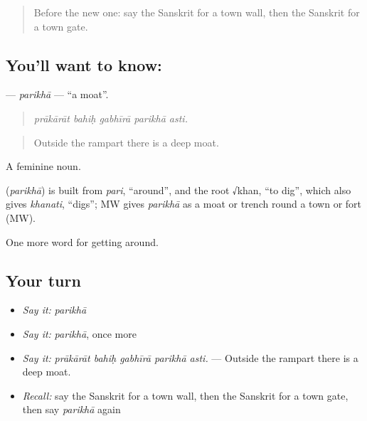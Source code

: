 \label{lesson:SA-C422-parikha}



\begin{quote}
Before the new one: say the Sanskrit for a town wall, then the Sanskrit for a town gate.
\end{quote}

\subsection*{You'll want to know: }
\textbf{} — \emph{parikhā} — \textquotedblleft{}a moat\textquotedblright{}.

\begin{quote}
    
\end{quote}

\begin{quote}
\emph{prākārāt bahiḥ gabhīrā parikhā asti.}
\end{quote}

\begin{quote}
Outside the rampart there is a deep moat.
\end{quote}

A feminine noun.

\begin{cousinweb}
\textbf{} (\emph{parikhā}) is built from \emph{pari}, \textquotedblleft{}around\textquotedblright{}, and the root √khan, \textquotedblleft{}to dig\textquotedblright{}, which also gives \emph{khanati}, \textquotedblleft{}digs\textquotedblright{}; MW gives \emph{parikhā} as a moat or trench round a town or fort (MW).
\end{cousinweb}

\begin{grammarlens}[title={What you've built}]
One more word for getting around.
\end{grammarlens}

\subsection*{Your turn}
\begin{itemize}
\raggedright
  \item \emph{Say it:} \emph{parikhā}
  \item \emph{Say it:} \emph{parikhā}, once more
  \item \emph{Say it:} \emph{prākārāt bahiḥ gabhīrā parikhā asti.} — Outside the rampart there is a deep moat.
  \item \emph{Recall:} say the Sanskrit for a town wall, then the Sanskrit for a town gate, then say \emph{parikhā} again
\end{itemize}

